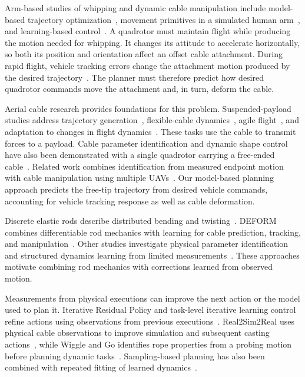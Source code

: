 \documentclass[letterpaper, 10 pt, conference]{ieeeconf}
\begin{document}
Arm-based studies of whipping and dynamic cable manipulation
include model-based trajectory
optimization~\cite{zimmermann2021dynamic}, movement primitives in a
simulated human arm~\cite{nah2023learning}, and learning-based
control~\cite{wang2024learning}. A quadrotor must maintain flight
while producing the motion needed for whipping. It changes its
attitude to accelerate horizontally, so both its position and
orientation affect an offset cable attachment. During rapid flight,
vehicle tracking errors change the attachment motion produced by
the desired trajectory~\cite{torrente2021data}. The planner must
therefore predict how desired quadrotor commands move the attachment
and, in turn, deform the cable.

Aerial cable research provides foundations for this problem.
Suspended-payload studies address trajectory
generation~\cite{sreenath2013trajectory}, flexible-cable
dynamics~\cite{8308004}, agile flight~\cite{cao2026flare}, and
adaptation to changes in flight dynamics~\cite{belkhale2021model}.
These tasks use the cable to transmit forces to a payload.
Cable parameter identification and dynamic shape control have also
been demonstrated with a single quadrotor carrying a free-ended
cable~\cite{shen2025aerial}. Related work combines identification
from measured endpoint motion with cable manipulation using
multiple UAVs~\cite{gabellieri2025manipulation}.
Our model-based planning approach predicts the free-tip trajectory
from desired vehicle commands, accounting for vehicle tracking
response as well as cable deformation.

Discrete elastic rods describe distributed bending and
twisting~\cite{bergou2008discrete}. DEFORM combines differentiable
rod mechanics with learning for cable prediction, tracking, and
manipulation~\cite{pmlr-v270-chen25d}. Other studies investigate
physical parameter identification~\cite{chen2025accurate} and
structured dynamics learning from limited
measurements~\cite{mamedov2025learning}. These approaches motivate
combining rod mechanics with corrections learned from observed
motion.

Measurements from physical executions can improve the next action
or the model used to plan it. Iterative Residual Policy and
task-level iterative learning control refine actions using
observations from previous
executions~\cite{chi2024iterative,suresh2026learning}.
Real2Sim2Real uses physical cable observations to improve simulation
and subsequent casting actions~\cite{lim2022real2sim2real}, while
Wiggle and Go identifies rope properties from a probing motion
before planning dynamic tasks~\cite{jakobsson2026wiggle}.
Sampling-based planning has also been combined with repeated
fitting of learned dynamics~\cite{williams2017information}.
\end{document}
